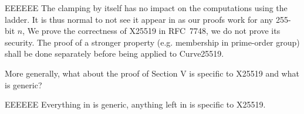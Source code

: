 \begin{answer}{EEEEEE}
  The clamping by itself has no impact on the computations using the ladder.
  It is thus normal to not see it appear in  as our proofs work for any 255-bit $n$,
  We prove the correctness of X25519 in RFC~7748, we do not prove its security.
  The proof of a stronger property (e.g. membership in prime-order group)
  shall be done separately before being applied to Curve25519.
\end{answer}

More generally, what about the proof of Section V is
specific to X25519 and what is generic?

\begin{answer}{EEEEEE}
  Everything in  is generic, anything left in 
  is specific to X25519.
\end{answer}
